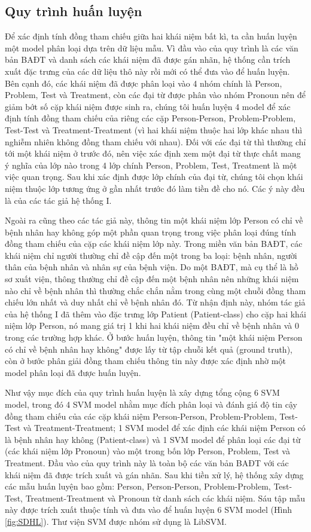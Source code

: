 \subsection*{Quy trình huấn luyện}
Để xác định tính đồng tham chiếu giữa hai khái niệm bất kì, ta cần huấn luyện một model phân loại dựa trên dữ liệu mẫu. Vì đầu vào của quy trình là các văn bản BAĐT và danh sách các khái niệm đã được gán nhãn, hệ thống cần trích xuất đặc trưng của các dữ liệu thô này rồi mới có thể đưa vào để huấn luyện. Bên cạnh đó, các khái niệm đã được phân loại vào 4 nhóm chính là Person, Problem, Test và Treatment, còn các đại từ được phân vào nhóm Pronoun nên để giảm bớt số cặp khái niệm được sinh ra, chúng tôi huấn luyện 4 model để xác định tính đồng tham chiếu của riêng các cặp Person-Person, Problem-Problem, Test-Test và Treatment-Treatment (vì hai khái niệm thuộc hai lớp khác nhau thì nghiễm nhiên không đồng tham chiếu với nhau). Đối với các đại từ thì thường chỉ tới một khái niệm ở trước đó, nên việc xác định xem một đại từ thực chất mang ý nghĩa của lớp nào trong 4 lớp chính Person, Problem, Test, Treatment là một việc quan trọng. Sau khi xác định được lớp chính của đại từ, chúng tôi chọn khái niệm thuộc lớp tương ứng ở gần nhất trước đó làm tiền đề cho nó. Các ý này đều là của các tác giả hệ thống I.

Ngoài ra cũng theo các tác giả này, thông tin một khái niệm lớp Person có chỉ về bệnh nhân hay không góp một phần quan trọng trong việc phân loại đúng tính đồng tham chiếu của cặp các khái niệm lớp này. Trong miền văn bản BAĐT, các khái niệm chỉ người thường chỉ đề cập đến một trong ba loại: bệnh nhân, người thân của bệnh nhân và nhân sự của bệnh viện. Do một BAĐT, mà cụ thể là hồ sơ xuất viện, thông thường chỉ đề cập đến một bệnh nhân nên những khái niệm nào chỉ về bệnh nhân thì thường chắc chắn nằm trong cùng một chuỗi đồng tham chiếu lớn nhất và duy nhất chỉ về bệnh nhân đó. Từ nhận định này, nhóm tác giả của hệ thống I đã thêm vào đặc trưng lớp Patient (Patient-class) cho cặp hai khái niệm lớp Person, nó mang giá trị 1 khi hai khái niệm đều chỉ về bệnh nhân và 0  trong các trường hợp khác. Ở bước huấn luyện, thông tin "một khái niệm Person có chỉ về bệnh nhân hay không" được lấy từ tập chuỗi kết quả (ground truth), còn ở bước phân giải đồng tham chiếu thông tin này được xác định nhờ một model phân loại đã được huấn luyện.

Như vậy mục đích của quy trình huấn luyện là xây dựng tổng cộng 6 SVM model, trong đó 4 SVM model nhằm mục đích phân loại và đánh giá độ tin cậy đồng tham chiếu của các cặp khái niệm Person-Person, Problem-Problem, Test-Test và Treatment-Treatment; 1 SVM model để xác định các khái niệm Person có là bệnh nhân hay không (Patient-class) và 1 SVM model để phân loại các đại từ (các khái niệm lớp Pronoun) vào một trong bốn lớp Person, Problem, Test và Treatment. Đầu vào của quy trình này là toàn bộ các văn bản BAĐT với các khái niệm đã được trích xuất và gán nhãn. Sau khi tiền xử lý, hệ thống xây dựng các mẫu huấn luyện
bao gồm: Person, Person-Person, Problem-Problem, Test-Test, Treatment-Treatment và Pronoun từ danh sách các khái niệm. Sáu tập mẫu này được trích xuất thuộc tính và đưa vào để huấn luyện 6 SVM model (Hình \ref{fig:SDHL}). Thư viện SVM được nhóm sử dụng là LibSVM. 

